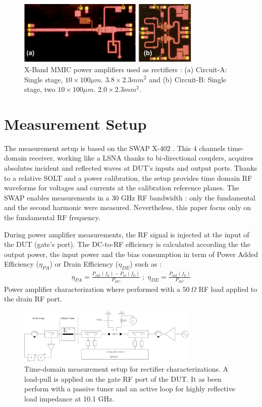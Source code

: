 \documentclass[conference]{IEEEtran}
\begin{document}
\begin{figure}[ht!] %
\centering
\includegraphics[width=3.45in]{IMS2014_Pictures_PA.png}
\caption{ X-Band MMIC power amplifiers used as rectifiers : (a) Circuit-A: Single stage, $10\times100\mu m$. $3.8\times2.3mm^2$ and (b) Circuit-B: Single stage, two $10\times100\mu m$. $2.0\times2.3mm^2$.}
\label{picture}
\end{figure}



\section{Measurement Setup}
The measurement setup is based on the SWAP X-402 \cite{Verspecht2010,Roblin2011}. This 4 channels time-domain receiver, working like a LSNA \cite{Verspecht2005} thanks to bi-directional couplers, acquires absolutes incident and reflected waves at DUT's inputs and output ports. Thanks to a relative SOLT and a power calibration, the setup provides time domain RF waveforms for voltages and currents at the calibration reference planes. The SWAP enables measurements in a $30$ GHz RF bandwidth : only the fundamental and the second harmonic were measured. Nevertheless, this paper focus only on the fundamental RF frequency.

During power amplifier measurements, the RF signal is injected at the input of the DUT (gate's port). The DC-to-RF efficiency is calculated according the the output power, the input power and the bias consumption in term of Power Added Efficiency ($\eta_{PA}$) or Drain Efficiency ($\eta_{DE}$) such as :
\begin{eqnarray}
\eta_{PA}=\frac{P_{out}\left(f_0\right)-P_{in}\left(f_0\right)}{P_{DC}} \; ; \; \eta_{DE}=\frac{P_{out}\left(f_0\right)}{P_{DC}}
\end{eqnarray}
Power amplifier characterization where performed with a $50\,\Omega$ RF load applied to the drain RF port.

\begin{figure}[ht!] %
\centering
\includegraphics[width=3.4in]{IMS2014_bench.pdf}
\caption{ Time-domain measurement setup for rectifier characterizations. A load-pull is applied on the gate RF port of the DUT. It as been perform with a passive tuner and an active loop for highly reflective load impedance at 10.1 GHz.}
\label{bench}
\end{figure}
\end{document}
